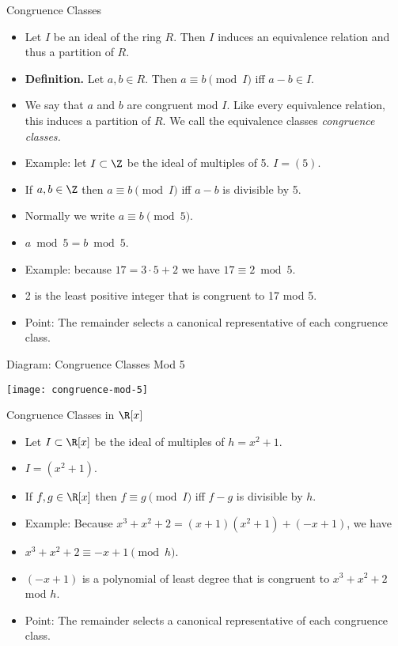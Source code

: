 \documentclass{beamer}
\begin{document}
\begin{frame}{Congruence Classes}

\begin{itemize}
  \item Let $I$ be an ideal of the ring $R$. Then $I$ induces an equivalence relation and thus a partition of $R$.
  \item \textbf{Definition.} Let $a,b\in R$. Then $a \equiv b \pmod I$ iff $a - b \in I$.
  \item We say that $a$ and $b$ are congruent mod $I$. Like every equivalence relation, this induces a partition of
  $R$. We call the equivalence classes \emph{congruence classes.}
  \item Example: let $I\subset \Z$ be the ideal of multiples of 5. $I=(5)$.
  \item If $a,b\in \Z$ then $a\equiv b \pmod I$ iff $a-b$ is divisible by 5.
  \item Normally we write $a\equiv b \pmod 5$.
  \item $a\bmod 5 = b \bmod 5$.
  \item Example: because $17 = 3 \cdot 5 + 2$ we have $17 \equiv 2 \bmod 5$.
  \item 2 is the least positive integer that is congruent to 17 mod 5.
  \item Point: The remainder selects a canonical representative of each congruence class.
\end{itemize}
\end{frame}


\begin{frame}{Diagram: Congruence Classes Mod 5}

\begin{center}
\texttt{[image: congruence-mod-5]}
\end{center}

\end{frame}



\begin{frame}{Congruence Classes in $\R[x]$}

\begin{itemize}
  \item Let $I \subset \R[x]$ be the ideal of multiples of $h = x^2+1$.
  \item $I = (x^2+1)$.
  \item If $f,g\in\R[x]$ then $f\equiv g \pmod I$ iff $f-g$ is divisible by $h$.
  \item Example: Because $x^3 + x^2 + 2 = (x+1)(x^2+1) + ( -x + 1)$, we have
  \item $x^3 + x^2 + 2 \equiv -x +1 \pmod {h}$.
  \item $(-x+1)$ is a polynomial of least degree that is congruent to $x^3 + x^2 + 2$ mod $h$.
  \item Point: The remainder selects a canonical representative of each congruence class.
\end{itemize}
\end{frame}
\end{document}
